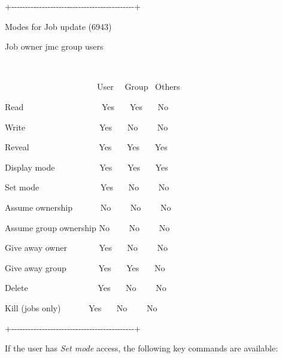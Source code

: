\begin{exparasmall}

+-{}-{}-{}-{}-{}-{}-{}-{}-{}-{}-{}-{}-{}-{}-{}-{}-{}-{}-{}-{}-{}-{}-{}-{}-{}-{}-{}-{}-{}-{}-{}-{}-{}-{}-{}-{}-{}-{}-{}-{}-{}-{}-{}-+

{\textbar}Modes for Job {\textquotesingle}update{\textquotesingle}
(6943) \ \ \ \ \ \ \ \ \ \ \ \ \ \ {\textbar}

{\textbar}Job owner jmc group users
\ \ \ \ \ \ \ \ \ \ \ \ \ \ \ \ \ \ {\textbar}

{\textbar}
\ \ \ \ \ \ \ \ \ \ \ \ \ \ \ \ \ \ \ \ \ \ \ \ \ \ \ \ \ \ \ \ \ \ \ \ \ \ \ \ \ \ \ {\textbar}

{\textbar} \ \ \ \ \ \ \ \ \ \ \ \ \ \ \ \ \ \ \ \ \ \ User \ \ Group
\ Others {\textbar}

{\textbar}Read \ \ \ \ \ \ \ \ \ \ \ \ \ \ \ \ \ \ Yes \ \ \ Yes
\ \ \ No \ \ \ \ {\textbar}

{\textbar}Write \ \ \ \ \ \ \ \ \ \ \ \ \ \ \ \ \ Yes \ \ \ No
\ \ \ \ No \ \ \ \ {\textbar}

{\textbar}Reveal \ \ \ \ \ \ \ \ \ \ \ \ \ \ \ \ Yes \ \ \ Yes \ \ \ Yes
\ \ \ {\textbar}

{\textbar}Display mode \ \ \ \ \ \ \ \ \ \ Yes \ \ \ Yes \ \ \ Yes
\ \ \ {\textbar}

{\textbar}Set mode \ \ \ \ \ \ \ \ \ \ \ \ \ \ Yes \ \ \ No \ \ \ \ No
\ \ \ \ {\textbar}

{\textbar}Assume ownership \ \ \ \ \ \ No \ \ \ \ No \ \ \ \ No
\ \ \ \ {\textbar}

{\textbar}Assume group ownership No \ \ \ \ No \ \ \ \ No
\ \ \ \ {\textbar}

{\textbar}Give away owner \ \ \ \ \ \ \ Yes \ \ \ No \ \ \ \ No
\ \ \ \ {\textbar}

{\textbar}Give away group \ \ \ \ \ \ \ Yes \ \ \ Yes \ \ \ No
\ \ \ \ {\textbar}

{\textbar}Delete \ \ \ \ \ \ \ \ \ \ \ \ \ \ \ \ Yes \ \ \ No \ \ \ \ No
\ \ \ \ {\textbar}

{\textbar}Kill (jobs only) \ \ \ \ \ \ Yes \ \ \ No \ \ \ \ No
\ \ \ \ {\textbar}

+-{}-{}-{}-{}-{}-{}-{}-{}-{}-{}-{}-{}-{}-{}-{}-{}-{}-{}-{}-{}-{}-{}-{}-{}-{}-{}-{}-{}-{}-{}-{}-{}-{}-{}-{}-{}-{}-{}-{}-{}-{}-{}-{}-+

\end{exparasmall}

If the user has \textit{Set mode} access, the following key commands are
available:

